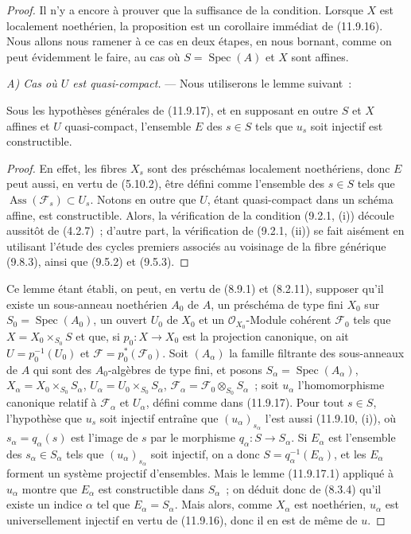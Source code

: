 \begin{proof}
Il n'y a encore à prouver que la suffisance de la condition. Lorsque $X$ est
localement noethérien, la proposition est un corollaire immédiat de (11.9.16).
Nous allons nous ramener à ce cas en deux étapes, en nous bornant, comme on
peut évidemment le faire, au cas où $S=\operatorname{Spec}(A)$ et $X$ sont
affines.

\emph{A) Cas où $U$ est quasi-compact.} --- Nous utiliserons le lemme suivant~:

\begin{lemma}[11.9.17.1]
\label{IV.11.9.17.1-fr}
Sous les hypothèses générales de (11.9.17), et en supposant en outre $S$ et
$X$ affines et $U$ quasi-compact, l'ensemble $E$ des $s\in S$ tels que $u_s$
soit injectif est constructible.
\end{lemma}

\begin{proof}
En effet, les fibres $X_s$ sont des préschémas localement noethériens, donc
$E$ peut aussi, en vertu de (5.10.2), être défini comme l'ensemble des
$s\in S$ tels que $\operatorname{Ass}(\mathcal F_s)\subset U_s$. Notons en
outre que $U$, étant quasi-compact dans un schéma affine, est constructible.
Alors, la vérification de la condition (9.2.1, (i)) découle aussitôt de
(4.2.7)~; d'autre
part, la vérification de (9.2.1, (ii)) se fait aisément en utilisant l'étude des
cycles premiers associés au voisinage de la fibre générique (9.8.3), ainsi que
(9.5.2) et (9.5.3).
\end{proof}

Ce lemme étant établi, on peut, en vertu de (8.9.1) et (8.2.11), supposer qu'il
existe un sous-anneau noethérien $A_0$ de $A$, un préschéma de type fini $X_0$
sur $S_0=\operatorname{Spec}(A_0)$, un ouvert $U_0$ de $X_0$ et un
$\mathcal O_{X_0}$-Module cohérent $\mathcal F_0$ tels que
$X=X_0\times_{S_0}S$ et que, si $p_0:X\to X_0$ est la projection canonique,
on ait $U=p_0^{-1}(U_0)$ et $\mathcal F=p_0^*(\mathcal F_0)$. Soit
$(A_\alpha)$ la famille filtrante des sous-anneaux de $A$ qui sont des
$A_0$-algèbres de type fini, et posons
$S_\alpha=\operatorname{Spec}(A_\alpha)$,
$X_\alpha=X_0\times_{S_0}S_\alpha$,
$U_\alpha=U_0\times_{S_0}S_\alpha$,
$\mathcal F_\alpha=\mathcal F_0\otimes_{S_0}S_\alpha$~; soit $u_\alpha$
l'homomorphisme canonique relatif à $\mathcal F_\alpha$ et $U_\alpha$, défini
comme dans (11.9.17). Pour tout $s\in S$, l'hypothèse que $u_s$ soit injectif
entraîne que $(u_\alpha)_{s_\alpha}$ l'est aussi (11.9.10, (i)), où
$s_\alpha=q_\alpha(s)$ est l'image de $s$ par le morphisme
$q_\alpha:S\to S_\alpha$. Si $E_\alpha$ est l'ensemble des
$s_\alpha\in S_\alpha$ tels que $(u_\alpha)_{s_\alpha}$ soit injectif, on a
donc $S=q_\alpha^{-1}(E_\alpha)$, et les $E_\alpha$ forment un système
projectif d'ensembles. Mais le lemme (11.9.17.1) appliqué à $u_\alpha$ montre
que $E_\alpha$ est constructible dans $S_\alpha$~; on déduit donc de (8.3.4)
qu'il existe un indice $\alpha$ tel que $E_\alpha=S_\alpha$. Mais alors, comme
$X_\alpha$ est noethérien, $u_\alpha$ est universellement injectif en vertu de
(11.9.16), donc il en est de même de $u$.


\end{proof}
